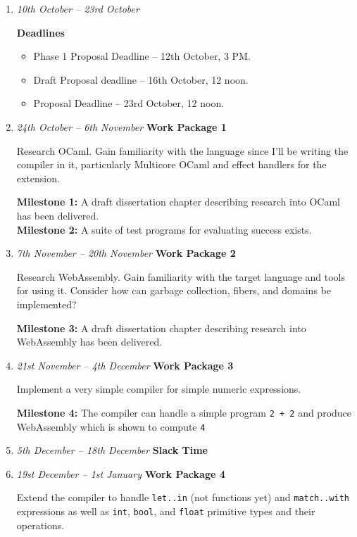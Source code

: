 \documentclass[a4paper,12pt]{article}
\begin{document}
\begin{enumerate}[label=\textbf{Slot \arabic*} -,start = 0]
 \item
 \emph{10th October -- 23rd October}

 \textbf{Deadlines}
 \begin{itemize}
  \item
  Phase 1 Proposal Deadline -- 12th October, 3 PM.
  \item
  Draft Proposal deadline -- 16th October, 12 noon.
  \item
  Proposal Deadline -- 23rd October, 12 noon.
 \end{itemize}

 \item
 \emph{24th October -- 6th November} \hfill \textbf{Work Package 1}

 Research OCaml.
 Gain familiarity with the language since I'll be writing the compiler in it, particularly Multicore OCaml and effect handlers for the extension.

 \textbf{Milestone 1:} A draft dissertation chapter describing research into OCaml has been delivered.   \\
 \textbf{Milestone 2:} A suite of test programs for evaluating success exists.

 \item
 \emph{7th November -- 20th November} \hfill \textbf{Work Package 2}

 Research WebAssembly.
 Gain familiarity with the target language and tools for using it.
 Consider how can garbage collection, fibers, and domains be implemented?

 \textbf{Milestone 3:} A draft dissertation chapter describing research into WebAssembly has been delivered.

 \item
 \emph{21st November -- 4th December} \hfill \textbf{Work Package 3}

 Implement a very simple compiler for simple numeric expressions.

 \textbf{Milestone 4:} The compiler can handle a simple program {\tt 2 + 2} and produce WebAssembly which is shown to compute {\tt 4}
 \item
 \emph{5th December -- 18th December} \hfill \textbf{Slack Time}

 \item
 \emph{19st December -- 1st January} \hfill \textbf{Work Package 4}

 Extend the compiler to handle {\tt let..in} (not functions yet) and {\tt match..with} expressions as well as {\tt int}, {\tt bool}, and {\tt float} primitive types and their operations.


\end{enumerate}
\end{document}
